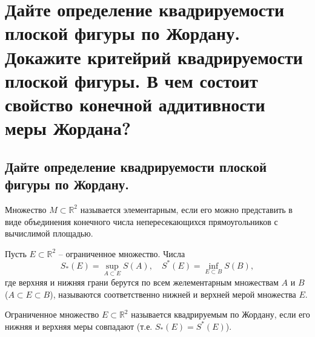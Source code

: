 \section{Дайте определение квадрируемости плоской фигуры по Жордану. Докажите критейрий квадрируемости плоской фигуры. В чем состоит свойство конечной аддитивности меры Жордана?}

\subsection{Дайте определение квадрируемости плоской фигуры по Жордану.}
\begin{definition}
    Множество $M \subset \mathbb{R}^2$ называется элементарным, если его можно представить в виде объединения конечного числа непересекающихся прямоугольников с вычислимой площадью.
\end{definition}
\begin{definition}
    Пусть $E \subset \mathbb{R}^2$ -- ограниченное множество. Числа
    \[
        S_*(E) = \sup_{A \subset E} S(A),
        \quad
        S^*(E) = \inf_{E \subset B} S(B),
    \] где верхняя и нижняя грани берутся по всем желементарным множествам $A$ и $B$ ($A \subset E \subset B$), называются соответственно нижней и верхней мерой множества $E$.
\end{definition}
\begin{definition}
    Ограниченное множество $E \subset \mathbb{R}^2$ называется квадрируемым по Жордану, если его нижняя и верхняя меры совпадают (т.е. $S_*(E) = S^*(E)$).
\end{definition}

